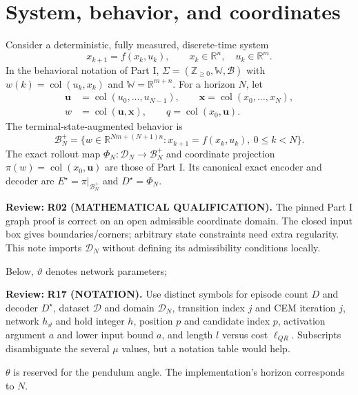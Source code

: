 \documentclass[11pt]{article}
\newcommand{\col}{\operatorname{col}}
\newcommand{\review}[1]{\par\noindent\textcolor{red!70!black}{\textbf{Review:} #1}\par}
\begin{document}
\section{System, behavior, and coordinates}
Consider a deterministic, fully measured, discrete-time system
\begin{equation}\label{eq:system}
x_{k+1}=f(x_k,u_k),\qquad x_k\in\mathbb R^n,\quad u_k\in\mathbb R^m.
\end{equation}
In the behavioral notation of Part I, $\Sigma=(\mathbb Z_{\geq0},\mathbb W,\mathcal B)$ with $w(k)=\col(u_k,x_k)$ and $\mathbb W=\mathbb R^{m+n}$. For a horizon $N$, let
\begin{align}
\mathbf u&=\col(u_0,\ldots,u_{N-1}),\qquad \mathbf x=\col(x_0,\ldots,x_N),\label{eq:sequences}\\
w&=\col(\mathbf u,\mathbf x),\qquad q=\col(x_0,\mathbf u).\label{eq:coordinates}
\end{align}
The terminal-state-augmented behavior is
\begin{equation}\label{eq:behavior}
\mathcal B_N^+=\{w\in\mathbb R^{Nm+(N+1)n}:x_{k+1}=f(x_k,u_k),\ 0\leq k<N\}.
\end{equation}
The exact rollout map $\Phi_N:\mathcal D_N\to\mathcal B_N^+$ and coordinate projection $\pi(w)=\col(x_0,\mathbf u)$ are those of Part I. Its canonical exact encoder and decoder are $E^\star=\pi|_{\mathcal B_N^+}$ and $D^\star=\Phi_N$.
\review{\textbf{R02 (MATHEMATICAL QUALIFICATION).} The pinned Part I graph proof is correct on an open admissible coordinate domain. The closed input box gives boundaries/corners; arbitrary state constraints need extra regularity. This note imports $\mathcal D_N$ without defining its admissibility conditions locally.}
 Below, $\vartheta$ denotes network parameters;
\review{\textbf{R17 (NOTATION).} Use distinct symbols for episode count $D$ and decoder $D^\star$, dataset $\mathcal D$ and domain $\mathcal D_N$, transition index $j$ and CEM iteration $j$, network $h_\vartheta$ and hold integer $h$, position $p$ and candidate index $p$, activation argument $a$ and lower input bound $a$, and length $l$ versus cost $\ell_{QR}$. Subscripts disambiguate the several $\mu$ values, but a notation table would help.}
 $\theta$ is reserved for the pendulum angle. The implementation's horizon corresponds to $N$.
\end{document}
